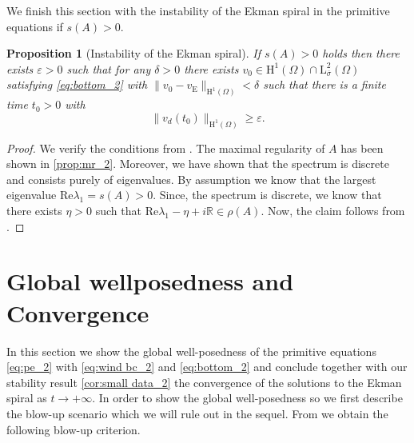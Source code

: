 \documentclass[preprint]{elsarticle}
\newtheorem{prop}[prop]{Proposition}
\numberwithin{equation}{section}
\newcommand {\R}	{\mathbb{R}}
\renewcommand{\Re}{\mathrm{Re}}
\renewcommand{\H}{\mathrm{H}}
\newcommand{\sigmabar}{\bar{\sigma}}
\renewcommand{\bar}[1]{\overline{#1}}
\newcommand{\rL}{\mathrm{L}}
\newcommand{\rH}{\H}
\newcommand{\rE}{\mathrm{E}}
\begin{document}
We finish this section with the instability of the Ekman spiral in the primitive equations if $s(A) > 0$. 

\begin{prop}[Instability of the Ekman spiral]\label{prop:instability_2}
	If $s(A) > 0$ holds then there exists $\varepsilon >0$ such that for any $\delta > 0$ there exists $v_0 \in \rH^{1}(\Omega) \cap \rL^2_{\sigmabar}(\Omega)$ satisfying \eqref{eq:bottom_2} with $\| v_0 - v_{\rE} \|_{\rH^1(\Omega)} < \delta$ such that there is a finite time $t_0 > 0$ with
	\begin{equation*}
		\| v_d(t_0) \|_{\rH^1(\Omega)} \geq \varepsilon . 
	\end{equation*}
\end{prop}
\begin{proof}
	We verify the conditions from \cite[Theorem 5.4.1]{PS:16_2}. The maximal regularity of $A$ has been shown in \autoref{prop:mr_2}. Moreover, we have shown that the spectrum is discrete and consists purely of eigenvalues. By assumption we know that the largest eigenvalue $\Re \lambda_1 = s(A) > 0$. Since, the spectrum is discrete, we know that there exists $\eta > 0$ such that $\Re\lambda_1 - \eta + i \R \in \rho(A)$. 
	Now, the claim follows from  \cite[Theorem~5.4.1]{PS:16_2}.
\end{proof} 

\section{Global wellposedness and Convergence}
\label{sec:global_2}

In this section we show the global well-posedness of the primitive equations \eqref{eq:pe_2} with \eqref{eq:wind bc_2} and \eqref{eq:bottom_2} and conclude together with our stability result \autoref{cor:small data_2} the convergence of the solutions to the Ekman spiral as $t \to + \infty$. 
In order to show the global well-posedness so we first describe the blow-up scenario which we will rule out in the sequel.
From \cite[Theorem 2.4]{PWS:18_2} we obtain the following blow-up criterion. 
\end{document}
